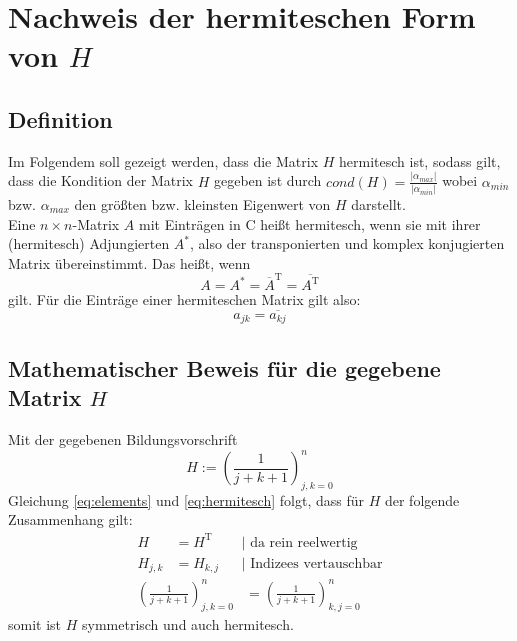 \documentclass{beamer}
\begin{document}
  \section{Nachweis der hermiteschen Form von $H$}
  \subsection{Definition}
  \begin{frame}
    Im Folgendem soll gezeigt werden, dass die Matrix $H$ hermitesch ist, sodass gilt, dass die 
    Kondition der Matrix $H$ gegeben ist durch
    $cond(H)=\frac{|\alpha_{max}|}{|\alpha_{min}|}$ wobei $\alpha_{min}$ bzw. $\alpha_{max}$ 
    den größten bzw. kleinsten Eigenwert von $H$ darstellt.
    \\[1em]
    Eine \(n \times n\)-Matrix \(A\) mit Einträgen in \(\mathrm{C}\) heißt hermitesch, wenn sie mit
    ihrer (hermitesch) Adjungierten \(A^*\), also der transponierten und komplex konjugierten Matrix
    übereinstimmt. Das heißt, wenn
    \begin{equation}
      \label{eq:hermitesch}
        A = A^* = \overline A^{\mathrm T} = \overline{A^{\mathrm T}}
    \end{equation}
    gilt.
    Für die Einträge einer hermiteschen Matrix gilt also:
    \begin{equation}
    \label{eq:elements}
        a_{jk} = \overline{a_{kj}}
    \end{equation}
  \end{frame}
  
  \subsection{Mathematischer Beweis für die gegebene Matrix $H$}
  \begin{frame}
    Mit der gegebenen Bildungsvorschrift
    \begin{equation}
        H := \left(\frac{1}{j+k+1}\right)_{j,k=0}^{n}
    \end{equation}
    Gleichung \ref{eq:elements} und \ref{eq:hermitesch} folgt, dass für \(H\) der
    folgende Zusammenhang gilt:
    \begin{align}
                                          H &= H^{\mathrm T} &&| \text{ da rein reelwertig}      \\
                                    H_{j,k} &= H_{k,j} &&| \text{ Indizees vertauschbar}         
    \end{align}    
    \begin{align}
    \left(\frac{1}{j+k+1}\right)_{j,k=0}^{n} &= \left(\frac{1}{j+k+1}\right)_{k,j=0}^{n} &&
    \end{align}
    somit ist \(H\) symmetrisch und auch hermitesch.
  \end{frame}
  
\end{document}
